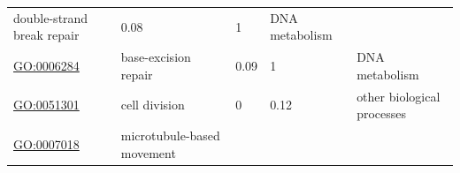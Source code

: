 \documentclass[
]{article}
\begin{document}
\begin{longtable}[]{@{}lllll@{}}
\begin{minipage}[t]{0.17\columnwidth}
double-strand break repair\strut
\end{minipage} & \begin{minipage}[t]{0.17\columnwidth}\raggedright
0.08\strut
\end{minipage} & \begin{minipage}[t]{0.17\columnwidth}\raggedright
1\strut
\end{minipage} & \begin{minipage}[t]{0.17\columnwidth}\raggedright
DNA metabolism\strut
\end{minipage}\tabularnewline
\begin{minipage}[t]{0.17\columnwidth}\raggedright
\url{GO:0006284}\strut
\end{minipage} & \begin{minipage}[t]{0.17\columnwidth}\raggedright
base-excision repair\strut
\end{minipage} & \begin{minipage}[t]{0.17\columnwidth}\raggedright
0.09\strut
\end{minipage} & \begin{minipage}[t]{0.17\columnwidth}\raggedright
1\strut
\end{minipage} & \begin{minipage}[t]{0.17\columnwidth}\raggedright
DNA metabolism\strut
\end{minipage}\tabularnewline
\begin{minipage}[t]{0.17\columnwidth}\raggedright
\url{GO:0051301}\strut
\end{minipage} & \begin{minipage}[t]{0.17\columnwidth}\raggedright
cell division\strut
\end{minipage} & \begin{minipage}[t]{0.17\columnwidth}\raggedright
0\strut
\end{minipage} & \begin{minipage}[t]{0.17\columnwidth}\raggedright
0.12\strut
\end{minipage} & \begin{minipage}[t]{0.17\columnwidth}\raggedright
other biological processes\strut
\end{minipage}\tabularnewline
\begin{minipage}[t]{0.17\columnwidth}\raggedright
\url{GO:0007018}\strut
\end{minipage} & \begin{minipage}[t]{0.17\columnwidth}\raggedright
microtubule-based movement\strut
\end{minipage} & \begin{minipage}[t]{0.17\columnwidth}\raggedright

\end{minipage}
\end{longtable}
\end{document}

